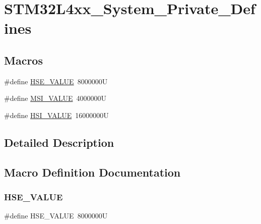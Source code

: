 \hypertarget{group___s_t_m32_l4xx___system___private___defines}{}\section{S\+T\+M32\+L4xx\+\_\+\+System\+\_\+\+Private\+\_\+\+Defines}
\label{group___s_t_m32_l4xx___system___private___defines}
\subsection*{Macros}
\begin{DoxyCompactItemize}
\item 
\#define \hyperlink{group___s_t_m32_l4xx___system___private___defines_gaeafcff4f57440c60e64812dddd13e7cb}{H\+S\+E\+\_\+\+V\+A\+L\+UE}~8000000U
\item 
\#define \hyperlink{group___s_t_m32_l4xx___system___private___defines_ga90e2a73d7fe4a7425c6e31fef5ce7263}{M\+S\+I\+\_\+\+V\+A\+L\+UE}~4000000U
\item 
\#define \hyperlink{group___s_t_m32_l4xx___system___private___defines_gaaa8c76e274d0f6dd2cefb5d0b17fbc37}{H\+S\+I\+\_\+\+V\+A\+L\+UE}~16000000U
\end{DoxyCompactItemize}


\subsection{Detailed Description}


\subsection{Macro Definition Documentation}
\mbox{\label{group___s_t_m32_l4xx___system___private___defines_gaeafcff4f57440c60e64812dddd13e7cb}} 
\subsubsection{\texorpdfstring{H\+S\+E\+\_\+\+V\+A\+L\+UE}{HSE\_VALUE}}
{\footnotesize\ttfamily \#define H\+S\+E\+\_\+\+V\+A\+L\+UE~8000000U}

